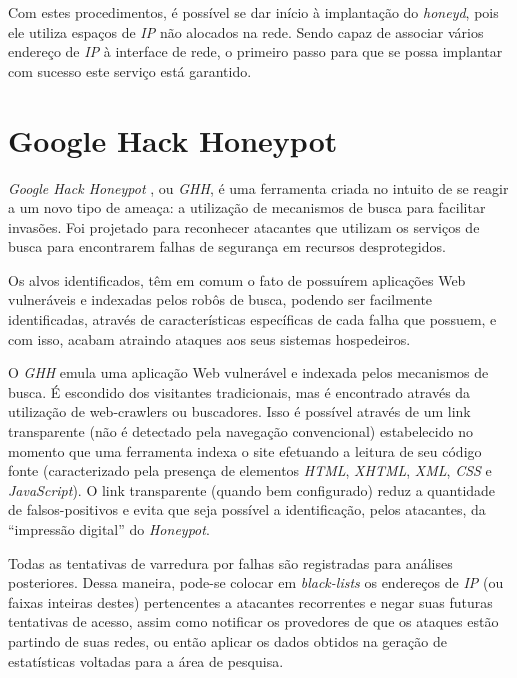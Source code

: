 Com estes procedimentos, é possível se dar início à implantação do \textit{honeyd}, pois ele utiliza espaços de \textit{IP} não alocados na rede. Sendo capaz de associar vários endereço de \textit{IP} à interface de rede, o primeiro passo para que se possa implantar com sucesso este serviço está garantido.


\section{Google Hack Honeypot}

\textit{Google Hack Honeypot} \cite{GHH}, ou \textit{GHH}, é uma ferramenta criada no intuito de se reagir a um novo tipo de ameaça: a utilização de mecanismos de busca para facilitar invasões. Foi projetado para reconhecer atacantes que utilizam os serviços de busca para encontrarem falhas de segurança em recursos desprotegidos.

Os alvos identificados, têm em comum o fato de possuírem aplicações Web vulneráveis e indexadas pelos robôs de busca, podendo ser facilmente identificadas, através de características específicas de cada falha que possuem, e com isso, acabam atraindo ataques aos seus sistemas hospedeiros.

O \textit{GHH} emula uma aplicação Web vulnerável e indexada pelos mecanismos de busca. É escondido dos visitantes tradicionais, mas é encontrado através da utilização de web-crawlers ou buscadores. Isso é possível através de um link transparente (não é detectado pela navegação convencional) estabelecido no momento que uma ferramenta indexa o site efetuando a leitura de seu código fonte (caracterizado pela presença de elementos \textit{HTML}, \textit{XHTML}, \textit{XML}, \textit{CSS} e \textit{JavaScript}). O link transparente (quando bem configurado) reduz a quantidade de falsos-positivos e evita que seja possível a identificação, pelos atacantes, da ``impressão digital'' do \textit{Honeypot}.

Todas as tentativas de varredura por falhas são registradas para análises posteriores. Dessa maneira, pode-se colocar em \textit{black-lists} os endereços de \textit{IP} (ou faixas inteiras destes) pertencentes a atacantes recorrentes e negar suas futuras tentativas de acesso, assim como notificar os provedores de que os ataques estão partindo de suas redes, ou então aplicar os dados obtidos na geração de estatísticas voltadas para a área de pesquisa.

